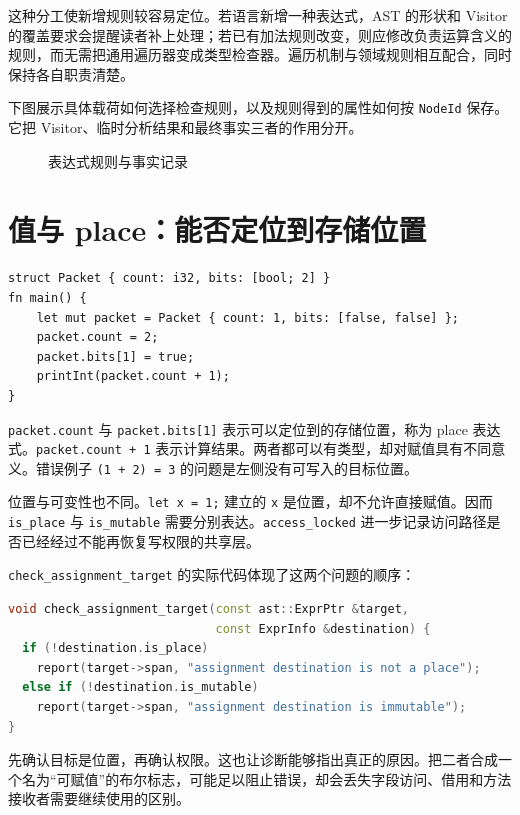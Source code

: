 这种分工使新增规则较容易定位。若语言新增一种表达式，AST 的形状和 Visitor 的覆盖要求会提醒读者补上处理；若已有加法规则改变，则应修改负责运算含义的规则，而无需把通用遍历器变成类型检查器。遍历机制与领域规则相互配合，同时保持各自职责清楚。

下图展示具体载荷如何选择检查规则，以及规则得到的属性如何按 \texttt{NodeId} 保存。它把 Visitor、临时分析结果和最终事实三者的作用分开。
\begin{figure}[htbp]
\centering
{}
\caption{表达式规则与事实记录}
\end{figure}

\section{值与 place：能否定位到存储位置}
\begin{lstlisting}[language=Rustless]
struct Packet { count: i32, bits: [bool; 2] }
fn main() {
    let mut packet = Packet { count: 1, bits: [false, false] };
    packet.count = 2;
    packet.bits[1] = true;
    printInt(packet.count + 1);
}
\end{lstlisting}
\lstinline[language=Rustless]|packet.count| 与 \lstinline[language=Rustless]|packet.bits[1]| 表示可以定位到的存储位置，称为 place 表达式。\lstinline[language=Rustless]|packet.count + 1| 表示计算结果。两者都可以有类型，却对赋值具有不同意义。错误例子 \lstinline[language=Rustless]|(1 + 2) = 3| 的问题是左侧没有可写入的目标位置。

位置与可变性也不同。\lstinline[language=Rustless]|let x = 1;| 建立的 \lstinline[language=Rustless]|x| 是位置，却不允许直接赋值。因而 \texttt{is\_place} 与 \texttt{is\_mutable} 需要分别表达。\texttt{access\_locked} 进一步记录访问路径是否已经经过不能再恢复写权限的共享层。

\texttt{check\_assignment\_target} 的实际代码体现了这两个问题的顺序：
\begin{lstlisting}[language=C++]
void check_assignment_target(const ast::ExprPtr &target,
                             const ExprInfo &destination) {
  if (!destination.is_place)
    report(target->span, "assignment destination is not a place");
  else if (!destination.is_mutable)
    report(target->span, "assignment destination is immutable");
}
\end{lstlisting}
先确认目标是位置，再确认权限。这也让诊断能够指出真正的原因。把二者合成一个名为“可赋值”的布尔标志，可能足以阻止错误，却会丢失字段访问、借用和方法接收者需要继续使用的区别。

